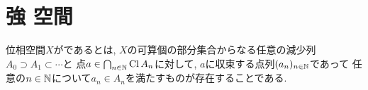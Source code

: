 \documentclass[uplatex, dvipdfmx, a4paper, 12pt, class=jsbook, crop=false]{standalone}
\begin{document}
\section{強 \Frechet 空間}
\label{sec:strongly-Frechet-spaces}

\begin{definition}
	位相空間$ X $がであるとは,
	$ X $の可算個の部分集合からなる任意の減少列$ A_0 \supset A_1 \subset \cdots $と
	点$ a \in \bigcap_{n \in \mathbb{N}} \mathop{\mathrm{Cl}}\nolimits A_n $に対して,
	$ a $に収束する点列$ (a_n)_{n \in \mathbb{N}} $であって
	任意の$ n \in \mathbb{N} $について$ a_n \in A_n $を満たすものが存在することである.
\end{definition}
\end{document}
